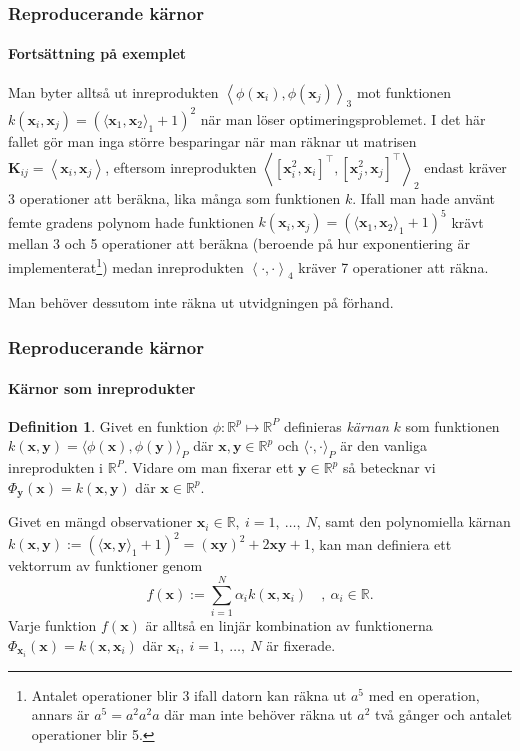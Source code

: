 \documentclass{beamer}
\theoremstyle{definition}
\newtheorem{defi}{Definition}[section]
\theoremstyle{remark}
\newcommand{\bfx}{\mathbf{x}}
\newcommand{\bfy}{\mathbf{y}}
\newcommand{\llangle}{\left\langle}
\newcommand{\rrangle}{\right\rangle}
\newcommand{\inner}[2]{\llangle #1, #2 \rrangle}
\begin{document}
\begin{frame}
\frametitle{Reproducerande kärnor}
\framesubtitle{Fortsättning på exemplet}
	Man byter alltså ut inreprodukten $\inner{\phi\left(\bfx_i\right)}{\phi\left(\bfx_j\right)}_3$ mot funktionen $k\left(\bfx_i, \bfx_j\right)=\left(\langle\bfx_1, \bfx_2 \rangle_1 + 1\right)^2$ när man löser optimeringsproblemet. I det här fallet gör man inga större besparingar när man räknar ut matrisen $\mathbf{K}_{ij}=\inner{\bfx_i}{\bfx_j}$, eftersom inreprodukten $\inner{[\bfx_i^2, \bfx_i]^\intercal}{[\bfx_j^2, \bfx_j]^\intercal}_2$ endast kräver 3 operationer att beräkna, lika många som funktionen $k$. Ifall man hade använt femte gradens polynom hade funktionen $k\left(\bfx_i, \bfx_j\right)=\left(\langle\bfx_1, \bfx_2 \rangle_1 + 1\right)^5$ krävt mellan 3 och 5 operationer att beräkna (beroende på hur exponentiering är implementerat\footnote{Antalet operationer blir 3 ifall datorn kan räkna ut $a^5$ med en operation, annars är $a^5=a^2a^2a$ där man inte behöver räkna ut $a^2$ två gånger och antalet operationer blir 5.}) medan inreprodukten $\inner{\cdot}{\cdot}_4$ kräver 7 operationer att räkna.
	
	Man behöver dessutom inte räkna ut utvidgningen på förhand.
\end{frame}

\begin{frame}
\frametitle{Reproducerande kärnor}
\framesubtitle{Kärnor som inreprodukter}
\begin{defi}\label{def:kärna}
	Givet en funktion $\phi: \mathbb{R}^p \longmapsto \mathbb{R}^P$ definieras \emph{kärnan} $k$ som funktionen $k\left(\bfx, \bfy\right) = \langle \phi \left(\bfx\right), \phi\left(\bfy\right) \rangle_P$ där $\bfx, \bfy \in \mathbb{R}^p$ och $\langle \cdot, \cdot \rangle_P$ är den vanliga inreprodukten i $\mathbb{R}^P$.
	Vidare om man fixerar ett $\bfy\in\mathbb{R}^p$ så betecknar vi $\Phi_{\bfy}\left(\bfx\right) = k\left(\bfx, \bfy\right)$ där $\bfx\in\mathbb{R}^p$.
\end{defi}
Givet en mängd observationer $\bfx_i\in\mathbb{R},~i=1,~\dots,~N$, samt den polynomiella kärnan $k\left(\bfx, \bfy\right):=\left(\langle \bfx, \bfy \rangle_1 + 1\right)^2 = \left(\bfx\bfy\right)^{2} + 2\bfx\bfy + 1$, kan man definiera ett vektorrum av funktioner genom
\begin{equation*}
f\left(\bfx\right):=\sum_{i=1}^{N}\alpha_ik\left(\bfx, \bfx_i\right)\quad ,~\alpha_i\in\mathbb{R}.
\end{equation*}
Varje funktion $f\left(\bfx\right)$ är alltså en linjär kombination av funktionerna $\Phi_{\bfx_i}\left(\bfx\right)=k\left(\bfx,\bfx_i\right)$ där $\bfx_i,~i=1,~\dots,~N$ är fixerade.
\end{frame}
\end{document}
